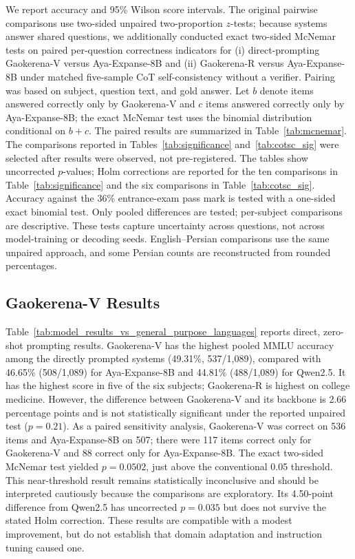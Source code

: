 \documentclass[manuscript,screen,review]{acmart}
\begin{document}
We report accuracy and 95\% Wilson score intervals. The original pairwise comparisons use two-sided unpaired two-proportion $z$-tests; because systems answer shared questions, we additionally conducted exact two-sided McNemar tests on paired per-question correctness indicators for (i) direct-prompting Gaokerena-V versus Aya-Expanse-8B and (ii) Gaokerena-R versus Aya-Expanse-8B under matched five-sample CoT self-consistency without a verifier. Pairing was based on subject, question text, and gold answer. Let $b$ denote items answered correctly only by Gaokerena-V and $c$ items answered correctly only by Aya-Expanse-8B; the exact McNemar test uses the binomial distribution conditional on $b+c$. The paired results are summarized in Table~\ref{tab:mcnemar}. The comparisons reported in Tables~\ref{tab:significance} and~\ref{tab:cotsc_sig} were selected after results were observed, not pre-registered. The tables show uncorrected $p$-values; Holm corrections are reported for the ten comparisons in Table~\ref{tab:significance} and the six comparisons in Table~\ref{tab:cotsc_sig}. Accuracy against the 36\% entrance-exam pass mark is tested with a one-sided exact binomial test. Only pooled differences are tested; per-subject comparisons are descriptive. These tests capture uncertainty across questions, not across model-training or decoding seeds. English--Persian comparisons use the same unpaired approach, and some Persian counts are reconstructed from rounded percentages.

\subsection{Gaokerena-V Results}\label{subsec6.1}

Table~\ref{tab:model_results_vs_general_purpose_languages} reports direct, zero-shot prompting results. Gaokerena-V has the highest pooled MMLU accuracy among the directly prompted systems (49.31\%, 537/1,089), compared with 46.65\% (508/1,089) for Aya-Expanse-8B and 44.81\% (488/1,089) for Qwen2.5. It has the highest score in five of the six subjects; Gaokerena-R is highest on college medicine. However, the difference between Gaokerena-V and its backbone is 2.66 percentage points and is not statistically significant under the reported unpaired test ($p=0.21$). As a paired sensitivity analysis, Gaokerena-V was correct on 536 items and Aya-Expanse-8B on 507; there were 117 items correct only for Gaokerena-V and 88 correct only for Aya-Expanse-8B. The exact two-sided McNemar test yielded $p=0.0502$, just above the conventional 0.05 threshold. This near-threshold result remains statistically inconclusive and should be interpreted cautiously because the comparisons are exploratory. Its 4.50-point difference from Qwen2.5 has uncorrected $p=0.035$ but does not survive the stated Holm correction. These results are compatible with a modest improvement, but do not establish that domain adaptation and instruction tuning caused one.
\end{document}
